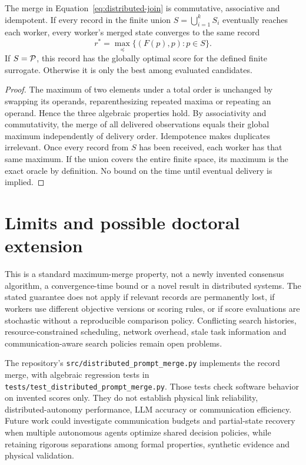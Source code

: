\begin{proposition}
\label{prop:distributed-best}
The merge in Equation~\eqref{eq:distributed-join} is commutative, associative
and idempotent. If every record in the finite union
$S=\bigcup_{i=1}^{k}S_i$ eventually reaches each worker, every worker's
merged state converges to the same record
\[
  r^*=\max_{\preceq}\bigl\{(F(p),p):p\in S\bigr\}.
\]
If $S=\mathcal P$, this record has the globally optimal score for the defined
finite surrogate. Otherwise it is only the best among evaluated candidates.
\end{proposition}
\begin{proof}
The maximum of two elements under a total order is unchanged by swapping
its operands, reparenthesizing repeated maxima or repeating an operand.
Hence the three algebraic properties hold. By associativity and
commutativity, the merge of all delivered observations equals their global
maximum independently of delivery order. Idempotence makes duplicates
irrelevant. Once every record from $S$ has been received, each worker has
that same maximum. If the union covers the entire finite space, its maximum
is the exact oracle by definition. No bound on the time until eventual
delivery is implied.
\end{proof}

\section{Limits and possible doctoral extension}
This is a standard maximum-merge property, not a newly invented consensus
algorithm, a convergence-time bound or a novel result in distributed
systems. The stated guarantee does not apply if relevant records are
permanently lost, if workers use different objective versions or scoring
rules, or if score evaluations are stochastic without a reproducible
comparison policy. Conflicting search histories, resource-constrained
scheduling, network overhead, stale task information and communication-aware
search policies remain open problems.

The repository's \texttt{src/distributed\_prompt\_merge.py} implements the
record merge, with algebraic regression tests in
\texttt{tests/test\_distributed\_prompt\_merge.py}. Those tests check
software behavior on invented scores only. They do not establish physical
link reliability, distributed-autonomy performance, LLM accuracy or
communication efficiency. Future work could investigate communication
budgets and partial-state recovery when multiple autonomous agents optimize
shared decision policies, while retaining rigorous separations among formal
properties, synthetic evidence and physical validation.
